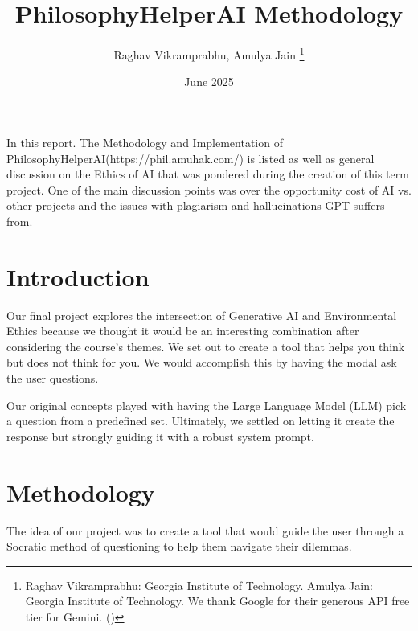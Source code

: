 \documentclass[letterpaper,11pt,leqno]{article}
\begin{document}
\title{PhilosophyHelperAI Methodology}

\author{Raghav Vikramprabhu, Amulya Jain
  \thanks{Raghav Vikramprabhu: Georgia Institute of Technology. Amulya Jain: Georgia Institute of Technology. We thank Google for their generous API free tier for Gemini. (\cite{GoogleAIDev}) }}

\date{June 2025}


\begin{titlepage}
  \maketitle

  In this report. The Methodology and Implementation of PhilosophyHelperAI(https://phil.amuhak.com/) is listed as well as general discussion on the Ethics of AI that was pondered during the creation of this term project. One of the main discussion points was over the opportunity cost of AI vs. other projects and the issues with plagiarism and hallucinations GPT suffers from. 

\end{titlepage}

\section{Introduction}\label{s:introduction}

Our final project explores the intersection of Generative AI and Environmental Ethics because we thought it would be an interesting combination after considering the course's themes. We set out to create a tool that helps you think but does not think for you. We would accomplish this by having the modal ask the user questions.

Our original concepts played with having the Large Language Model (LLM) pick a question from a predefined set. Ultimately, we settled on letting it create the response but strongly guiding it with a robust system prompt.

\section{Methodology}
The idea of our project was to create a tool that would guide the user through a Socratic method of questioning to help them navigate their dilemmas.
\end{document}
